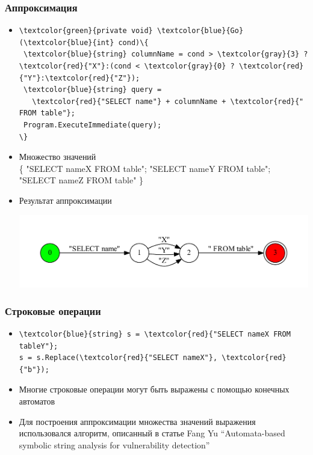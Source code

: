\documentclass{beamer}
\begin{document}
\begin{frame}[fragile]
\transwipe[direction=90]
\frametitle{Аппроксимация}
\begin{itemize}
\item 
\begin{Verbatim}[commandchars=\\\{\}]
\textcolor{green}{private void} \textcolor{blue}{Go} (\textcolor{blue}{int} cond)\{
 \textcolor{blue}{string} columnName = cond > \textcolor{gray}{3} ? \textcolor{red}{"X"}:(cond < \textcolor{gray}{0} ? \textcolor{red}{"Y"}:\textcolor{red}{"Z"});
 \textcolor{blue}{string} query = 
   \textcolor{red}{"SELECT name"} + columnName + \textcolor{red}{" FROM table"};
 Program.ExecuteImmediate(query);
\}
\end{Verbatim}

\item Множество значений\\         
\{ "SELECT nameX FROM table"; "SELECT nameY FROM table"; "SELECT nameZ FROM table" \}

        
\item Результат аппроксимации
\begin{center}
    {\includegraphics[width=1.0\linewidth]{tsql_test}}
\end{center}

\end{itemize}
\end{frame}

\begin{frame}[fragile]
\transwipe[direction=90]
\frametitle{Строковые операции}
\begin{itemize} 
\item 
    \begin{Verbatim}[commandchars=\\\{\}]
\textcolor{blue}{string} s = \textcolor{red}{"SELECT nameX FROM tableY"};
s = s.Replace(\textcolor{red}{"SELECT nameX"}, \textcolor{red}{"b"});
    \end{Verbatim}  

\item Многие строковые операции могут быть выражены с помощью конечных автоматов

\item Для построения аппроксимации множества значений выражения использовался алгоритм, описанный в статье Fang Yu  ``Automata-based symbolic string analysis for vulnerability detection''
\end{itemize}
\end{frame}
\end{document}
